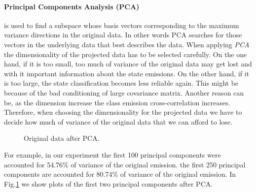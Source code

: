 \documentclass[lnicst]{svmultln}
\begin{document}
\paragraph{\textbf{Principal Components Analysis (PCA)}} is used to find a subspace whose basis vectors corresponding to the maximum variance directions in the original data. In other words PCA searches for those vectors in the underlying data that best describes the data. When applying \emph{PCA} the dimensionality of the projected data has to be selected carefully. On the one hand, if it is too small, too much of variance of the original data may get lost and with it important information about the state emissions. On the other hand, if it is too large, the state classification becomes less reliable again. This might be because of the bad conditioning of large covariance matrix. Another reason can be, as the dimension increase the class emission cross-correlation increases. Therefore, when choosing the dimensionality for the projected data we have to decide how much of variance of the original data that we can afford to lose. 

\begin{figure}[h]
	\centering
	\caption{Original data after PCA.}\label{fig:state-data-pca}
\end{figure}

For example, in our experiment the first 100 principal components were accounted for 54.76\% of variance of the original emission. the first 250 principal components are accounted for 80.74\% of variance of the original emission. In Fig.\ref{fig:state-data-pca} we show plots of the first two principal components after PCA.
\end{document}
